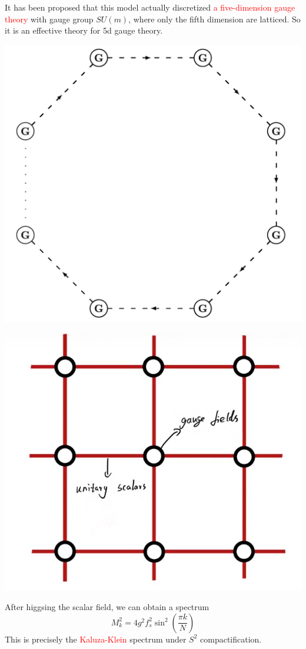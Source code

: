 \documentclass{beamer}
\begin{document}
\begin{frame}
    It has been proposed that this model actually discretized \textcolor{red}{a five-dimension gauge theory} with gauge group $SU(m)$, where 
    only the fifth dimension are latticed. So it is an effective theory for 5d gauge theory.
     \vspace{1em} %
    \begin{center}
    \begin{minipage}{0.45\textwidth}
        \centering
        \includegraphics[width=0.6\linewidth]{Moosed.jpeg} %
        \par\vspace{0.5em}
    \end{minipage}
    \hspace{0.05\textwidth}
    \begin{minipage}{0.45\textwidth}
        \centering
        \includegraphics[width=0.6\linewidth]{Lattice.jpg} %
        \par\vspace{0.5em}
    \end{minipage}
    \end{center}
    \pause
    After higgsing the scalar field, we can obtain a spectrum
    \begin{equation*}
        M_k^2=4g^2f_s^2\sin^2\left(\frac{\pi k}{N}\right)
    \end{equation*}
    This is precisely the \textcolor{red}{Kaluza-Klein} spectrum under $S^2$ compactification. 
\end{frame}
\end{document}
